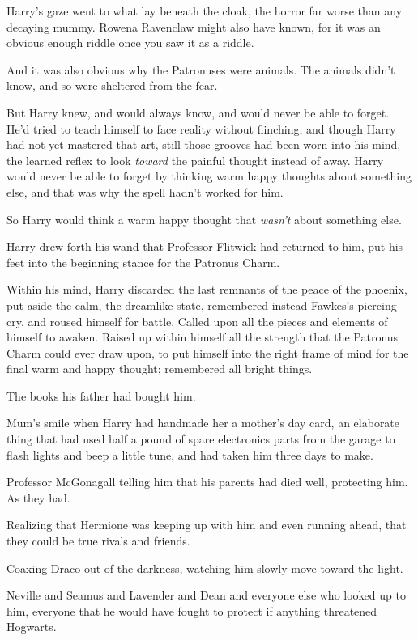 Harry's gaze went to what lay beneath the cloak, the horror far worse than any decaying mummy. Rowena Ravenclaw might also have known, for it was an obvious enough riddle once you saw it as a riddle.

And it was also obvious why the Patronuses were animals. The animals didn't know, and so were sheltered from the fear.

But Harry knew, and would always know, and would never be able to forget. He'd tried to teach himself to face reality without flinching, and though Harry had not yet mastered that art, still those grooves had been worn into his mind, the learned reflex to look \emph{toward} the painful thought instead of away. Harry would never be able to forget by thinking warm happy thoughts about something else, and that was why the spell hadn't worked for him.

So Harry would think a warm happy thought that \emph{wasn't} about something else.

Harry drew forth his wand that Professor Flitwick had returned to him, put his feet into the beginning stance for the Patronus Charm.

Within his mind, Harry discarded the last remnants of the peace of the phoenix, put aside the calm, the dreamlike state, remembered instead Fawkes's piercing cry, and roused himself for battle. Called upon all the pieces and elements of himself to awaken. Raised up within himself all the strength that the Patronus Charm could ever draw upon, to put himself into the right frame of mind for the final warm and happy thought; remembered all bright things.

The books his father had bought him.

Mum's smile when Harry had handmade her a mother's day card, an elaborate thing that had used half a pound of spare electronics parts from the garage to flash lights and beep a little tune, and had taken him three days to make.

Professor McGonagall telling him that his parents had died well, protecting him. As they had.

Realizing that Hermione was keeping up with him and even running ahead, that they could be true rivals and friends.

Coaxing Draco out of the darkness, watching him slowly move toward the light.

Neville and Seamus and Lavender and Dean and everyone else who looked up to him, everyone that he would have fought to protect if anything threatened Hogwarts.

